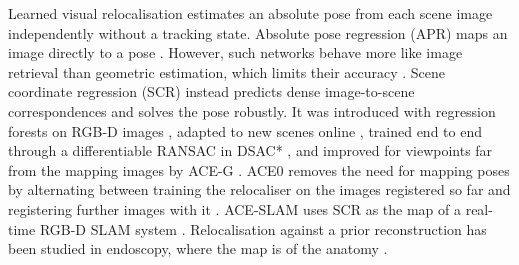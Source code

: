 \documentclass[9pt,shortpaper,twoside,web]{ieeecolor2}
\begin{document}
Learned visual relocalisation estimates an absolute pose from each scene image independently without a tracking state. Absolute pose regression (APR) maps an image directly to a pose \cite{7410693}. However, such networks behave more like image retrieval than geometric estimation, which limits their accuracy \cite{sattler2019}. Scene coordinate regression (SCR) instead predicts dense image-to-scene correspondences and solves the pose robustly. It was introduced with regression forests on RGB-D images \cite{shotton2013}, adapted to new scenes online \cite{cavallari2017onthefly,cavallari2019online}, trained end to end through a differentiable RANSAC in DSAC* \cite{brachmann2022dsac}, and improved for viewpoints far from the mapping images by ACE-G \cite{bruns2025aceg}. ACE0 removes the need for mapping poses by alternating between training the relocaliser on the images registered so far and registering further images with it \cite{brachmann2024ace0}. ACE-SLAM uses SCR as the map of a real-time RGB-D SLAM system \cite{alzugaray2025aceslam}. Relocalisation against a prior reconstruction has been studied in endoscopy, where the map is of the anatomy \cite{mahmoud2016orbslam}. 
\end{document}
